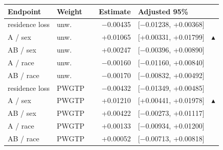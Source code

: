 \begin{tabular}{@{}lllrl@{\hspace{3pt}}c@{}}
\toprule
Endpoint & Weight & & Estimate & Adjusted 95\% & \\
\midrule
residence loss & unw. & & $-$0.00435 & [$-$0.01238, +0.00368] &  \\
A / sex & unw. & & +0.01065 & [+0.00331, +0.01799] & $\blacktriangle$ \\
AB / sex & unw. & & +0.00247 & [$-$0.00396, +0.00890] &  \\
A / race & unw. & & $-$0.00160 & [$-$0.01160, +0.00840] &  \\
AB / race & unw. & & $-$0.00170 & [$-$0.00832, +0.00492] &  \\
residence loss & PWGTP & & $-$0.00432 & [$-$0.01349, +0.00485] &  \\
A / sex & PWGTP & & +0.01210 & [+0.00441, +0.01978] & $\blacktriangle$ \\
AB / sex & PWGTP & & +0.00422 & [$-$0.00273, +0.01117] &  \\
A / race & PWGTP & & +0.00133 & [$-$0.00934, +0.01200] &  \\
AB / race & PWGTP & & +0.00052 & [$-$0.00713, +0.00818] &  \\
\bottomrule
\end{tabular}
